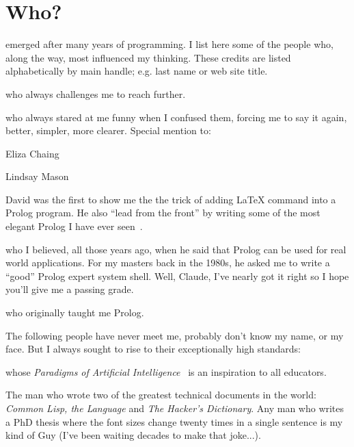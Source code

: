 \section{Who?}

{\PROD} emerged after many years of programming. I list here some
of the people who, along the way, most influenced my thinking.
These credits are listed alphabetically by main handle; e.g. last
name or web site title.


\bd

\item[Graham Mann:] who always challenges me to reach further.

\item[ Numerous grad students:] who always stared at me funny when
I confused them, forcing me to say it again, better, simpler, more
clearer. Special mention to: \bi \item Eliza Chaing \item Lindsay
Mason \ei

\item[David Poole:] David was the first to show me the the trick
of adding {\LaTeX} command into a Prolog program. He also ``lead
from the front'' by writing some of the most   elegant Prolog I
have ever seen~\cite{poole98}.

\item[Claude Sammut:] who I believed, all those years ago,  when
he said that Prolog can be used for real world applications. For
my masters back in the 1980s, he asked me to write a ``good''
Prolog expert system shell. Well, Claude, I've nearly got it right
so I hope you'll give me a passing grade.

\item[Roland Sammut and Michael Wise:] who originally taught me
Prolog.

\ed

The following people have never meet me, probably don't know my
name, or my face. But I always sought to rise to their
exceptionally high standards:

\bd

\item[Peter Norvig:] whose {\em Paradigms of Artificial
Intelligence}~\cite{norvig92} is an inspiration to all educators.

\item[Guy L. Steele:] The man who wrote two of the greatest
technical documents in the world: {\em Common Lisp, the Language}
and {\em The Hacker's Dictionary}.  Any man who writes a PhD
thesis where the font sizes change twenty times in a single
sentence is my kind of Guy (I've been waiting decades to make that
joke...). \ed
